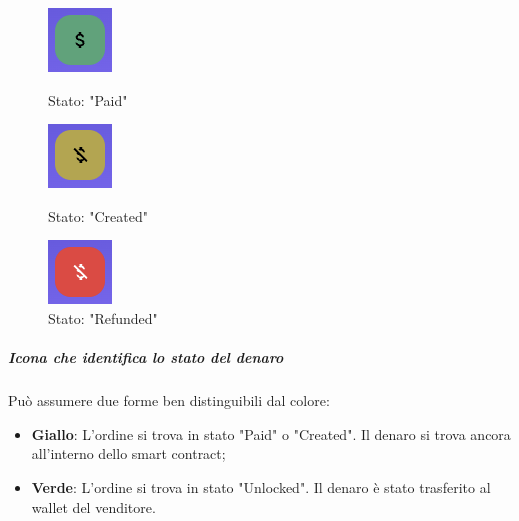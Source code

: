             \begin{figure}[H]
                \centering
                \begin{minipage}{0.33\textwidth}
                    \centering
                    \includegraphics[scale=0.6]{immagini/Transaction/Paid.png} 
                    \caption{Stato: "Paid"}
                \end{minipage}\hfill
                \begin{minipage}{0.33\textwidth}
                \centering
                    \includegraphics[scale=0.6]{immagini/Transaction/Created.png} 
                    \caption{Stato: "Created"}
                \end{minipage}
                \begin{minipage}{0.33\textwidth}
                    \centering
                        \includegraphics[scale=0.6]{immagini/Transaction/Refunded.png} 
                        \caption{Stato: "Refunded"}
                    \end{minipage}
            \end{figure}
            \subparagraph{Icona che identifica lo stato del denaro}
            Può assumere due forme ben distinguibili dal colore:
            \begin{itemize}
                \item \textbf{Giallo}: L'ordine si trova in stato "Paid" o "Created". Il denaro si trova ancora all'interno dello smart contract\glo{};
                \item \textbf{Verde}: L'ordine si trova in stato "Unlocked". Il denaro è stato trasferito al wallet\glo{} del venditore.
            \end{itemize}

